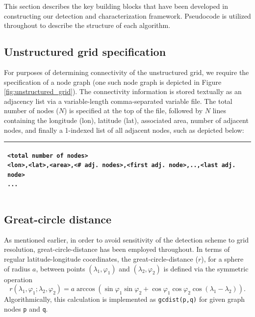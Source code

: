 \documentclass[gmdd, hvmath]{copernicus}
\begin{document}
This section describes the key building blocks that have been developed in constructing our detection and characterization framework.  Pseudocode is utilized throughout to describe the structure of each algorithm.

\subsection{Unstructured grid specification}

For purposes of determining connectivity of the unstructured grid, we require the specification of a node graph (one such node graph is depicted in Figure \ref{fig:unstructured_grid}).  The connectivity information is stored textually as an adjacency list via a variable-length comma-separated variable file.  The total number of nodes ($N$) is specified at the top of the file, followed by $N$ lines containing the longitude (lon), latitude (lat), associated area, number of adjacent nodes, and finally a 1-indexed list of all adjacent nodes, such as depicted below:
\ \\

\noindent \begin{tabular}{|p{\textwidth}|}
\hline \small \begin{verbatim}
<total number of nodes>
<lon>,<lat>,<area>,<# adj. nodes>,<first adj. node>,..,<last adj. node>
...
\end{verbatim} \\
\hline
\end{tabular}

\subsection{Great-circle distance}

As mentioned earlier, in order to avoid sensitivity of the detection scheme to grid resolution, great-circle-distance has been employed throughout.  In terms of regular latitude-longitude coordinates, the great-circle-distance ($r$), for a sphere of radius $a$, between points $(\lambda_1, \varphi_1)$ and $(\lambda_2, \varphi_2)$ is defined via the symmetric operation
\begin{equation}
r(\lambda_1, \varphi_1; \lambda_2, \varphi_2) = a \arccos \left( \sin \varphi_1 \sin \varphi_2 + \cos \varphi_1 \cos \varphi_2 \cos (\lambda_1 - \lambda_2) \right).
\end{equation}  Algorithmically, this calculation is implemented as \texttt{gcdist(p,q)} for given graph nodes \texttt{p} and \texttt{q}.
\end{document}
